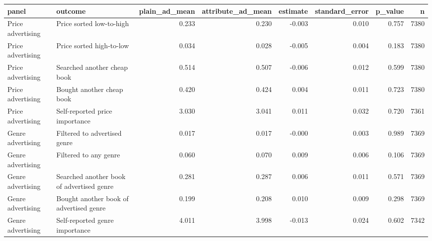 \begin{tabular}{llrrrrrr}
\toprule
panel & outcome & plain_ad_mean & attribute_ad_mean & estimate & standard_error & p_value & n \\
\midrule
Price advertising & Price sorted low-to-high & 0.233 & 0.230 & -0.003 & 0.010 & 0.757 & 7380 \\
Price advertising & Price sorted high-to-low & 0.034 & 0.028 & -0.005 & 0.004 & 0.183 & 7380 \\
Price advertising & Searched another cheap book & 0.514 & 0.507 & -0.006 & 0.012 & 0.599 & 7380 \\
Price advertising & Bought another cheap book & 0.420 & 0.424 & 0.004 & 0.011 & 0.723 & 7380 \\
Price advertising & Self-reported price importance & 3.030 & 3.041 & 0.011 & 0.032 & 0.720 & 7361 \\
Genre advertising & Filtered to advertised genre & 0.017 & 0.017 & -0.000 & 0.003 & 0.989 & 7369 \\
Genre advertising & Filtered to any genre & 0.060 & 0.070 & 0.009 & 0.006 & 0.106 & 7369 \\
Genre advertising & Searched another book of advertised genre & 0.281 & 0.287 & 0.006 & 0.011 & 0.571 & 7369 \\
Genre advertising & Bought another book of advertised genre & 0.199 & 0.208 & 0.010 & 0.009 & 0.298 & 7369 \\
Genre advertising & Self-reported genre importance & 4.011 & 3.998 & -0.013 & 0.024 & 0.602 & 7342 \\
\bottomrule
\end{tabular}
